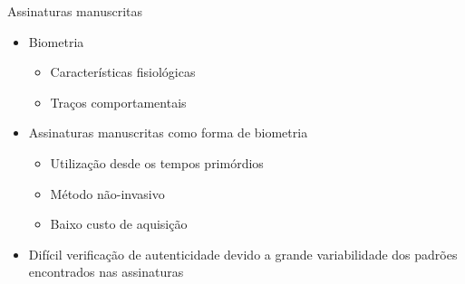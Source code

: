 
\begin{frame}{Assinaturas manuscritas}
	\begin{itemize}
		\item Biometria
		\begin{itemize}
			\item Características fisiológicas
			\item Traços comportamentais
		\end{itemize}
		\bigskip
		\item Assinaturas manuscritas como forma de biometria
		\begin{itemize}
			\item Utilização desde os tempos primórdios
			\item Método não-invasivo
			\item Baixo custo de aquisição
		\end{itemize}
		\bigskip
		\item Difícil verificação de autenticidade devido a grande variabilidade dos padrões encontrados nas assinaturas
	\end{itemize}
\end{frame}
